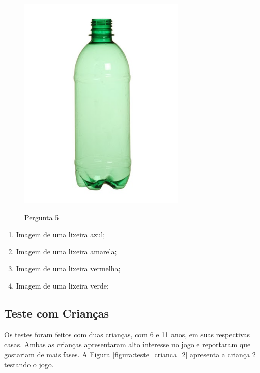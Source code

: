 \begin{enumerate}
    \begin{figure}[H]
        \caption{Pergunta 5}
        \centering
        \includegraphics[width=8cm]{Imagens/Cap5/Q5.png}
        \label{figura:q5}
    \end{figure}

     \begin{enumerate}
     \item Imagem de uma lixeira azul; 
     \item Imagem de uma lixeira amarela; 
     \item Imagem de uma lixeira vermelha; 
     \item Imagem de uma lixeira verde;
     \end{enumerate}


\end{enumerate}


\subsection{\textbf{Teste com Crianças}}
Os testes foram feitos com duas crianças, com 6 e 11 anos, em suas respectivas casas. Ambas as crianças apresentaram alto interesse no jogo e reportaram que gostariam de mais fases.  A Figura \ref{figura:teste_crianca_2} apresenta a criança 2 testando o jogo.

